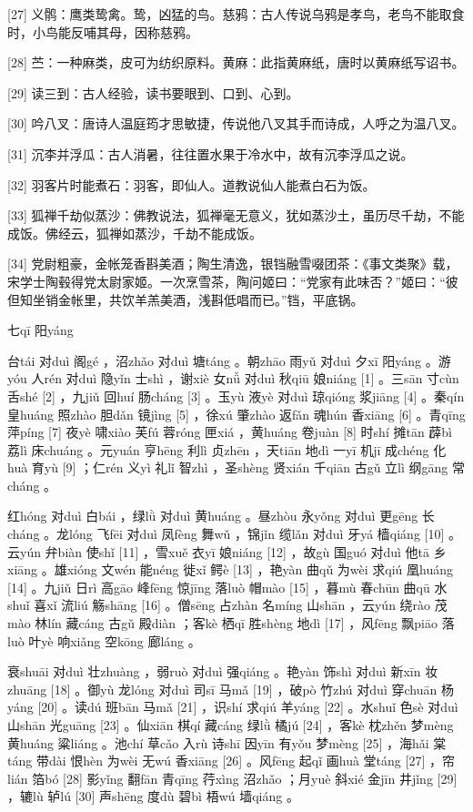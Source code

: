 \documentclass[12pt,UTF8]{ctexbook}
\begin{document}
[27] 义鹘：鹰类鸷禽。鸷，凶猛的鸟。慈鸦：古人传说乌鸦是孝鸟，老鸟不能取食时，小鸟能反哺其母，因称慈鸦。

[28] 苎：一种麻类，皮可为纺织原料。黄麻：此指黄麻纸，唐时以黄麻纸写诏书。

[29] 读三到：古人经验，读书要眼到、口到、心到。

[30] 吟八叉：唐诗人温庭筠才思敏捷，传说他八叉其手而诗成，人呼之为温八叉。

[31] 沉李并浮瓜：古人消暑，往往置水果于冷水中，故有沉李浮瓜之说。

[32] 羽客片时能煮石：羽客，即仙人。道教说仙人能煮白石为饭。

[33] 狐禅千劫似蒸沙：佛教说法，狐禅毫无意义，犹如蒸沙土，虽历尽千劫，不能成饭。佛经云，狐禅如蒸沙，千劫不能成饭。

[34] 党尉粗豪，金帐笼香斟美酒；陶生清逸，银铛融雪啜团茶：《事文类聚》载，宋学士陶毂得党太尉家姬。一次烹雪茶，陶问姬曰：“党家有此味否？”姬曰：“彼但知坐销金帐里，共饮羊羔美酒，浅斟低唱而已。”铛，平底锅。





七qī 阳yáng


台tái 对duì 阁gé ，沼zhǎo 对duì 塘táng 。朝zhāo 雨yǔ 对duì 夕xī 阳yáng 。游yóu 人rén 对duì 隐yǐn 士shì ，谢xiè 女nǚ 对duì 秋qiū 娘niáng [1] 。三sān 寸cùn 舌shé [2] ，九jiǔ 回huí 肠cháng [3] 。玉yù 液yè 对duì 琼qióng 浆jiāng [4] 。秦qín 皇huáng 照zhào 胆dǎn 镜jìng [5] ，徐xú 肇zhào 返fǎn 魂hún 香xiāng [6] 。青qīng 萍píng [7] 夜yè 啸xiào 芙fú 蓉róng 匣xiá ，黄huáng 卷juàn [8] 时shí 摊tān 薜bì 荔lì 床chuáng 。元yuán 亨hēng 利lì 贞zhēn ，天tiān 地dì 一yī 机jī 成chéng 化huà 育yù [9] ；仁rén 义yì 礼lǐ 智zhì ，圣shèng 贤xián 千qiān 古gǔ 立lì 纲gāng 常cháng 。

红hóng 对duì 白bái ，绿lǜ 对duì 黄huáng 。昼zhòu 永yǒng 对duì 更gēng 长cháng 。龙lóng 飞fēi 对duì 凤fèng 舞wǔ ，锦jǐn 缆lǎn 对duì 牙yá 樯qiáng [10] 。云yún 弁biàn 使shǐ [11] ，雪xuě 衣yī 娘niáng [12] ，故gù 国guó 对duì 他tā 乡xiāng 。雄xióng 文wén 能néng 徙xǐ 鳄è [13] ，艳yàn 曲qǔ 为wèi 求qiú 凰huáng [14] 。九jiǔ 日rì 高gāo 峰fēng 惊jīng 落luò 帽mào [15] ，暮mù 春chūn 曲qū 水shuǐ 喜xǐ 流liú 觞shāng [16] 。僧sēng 占zhàn 名míng 山shān ，云yún 绕rào 茂mào 林lín 藏cáng 古gǔ 殿diàn ；客kè 栖qī 胜shèng 地dì [17] ，风fēng 飘piāo 落luò 叶yè 响xiǎng 空kōng 廊láng 。

衰shuāi 对duì 壮zhuàng ，弱ruò 对duì 强qiáng 。艳yàn 饰shì 对duì 新xīn 妆zhuāng [18] 。御yù 龙lóng 对duì 司sī 马mǎ [19] ，破pò 竹zhú 对duì 穿chuān 杨yáng [20] 。读dú 班bān 马mǎ [21] ，识shí 求qiú 羊yáng [22] 。水shuǐ 色sè 对duì 山shān 光guāng [23] 。仙xiān 棋qí 藏cáng 绿lǜ 橘jú [24] ，客kè 枕zhěn 梦mèng 黄huáng 粱liáng 。池chí 草cǎo 入rù 诗shī 因yīn 有yǒu 梦mèng [25] ，海hǎi 棠táng 带dài 恨hèn 为wèi 无wú 香xiāng [26] 。风fēng 起qǐ 画huà 堂táng [27] ，帘lián 箔bó [28] 影yǐng 翻fān 青qīng 荇xìng 沼zhǎo ；月yuè 斜xié 金jīn 井jǐng [29] ，辘lù 轳lú [30] 声shēng 度dù 碧bì 梧wú 墙qiáng 。
\end{document}
